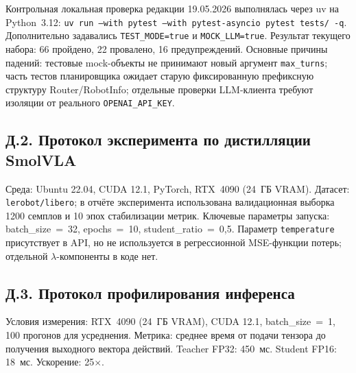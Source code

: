 \documentclass[14pt,a4paper]{extreport}
\begin{document}
Контрольная локальная проверка редакции 19.05.2026 выполнялась через uv на Python~3.12: \texttt{uv run --with pytest --with pytest-asyncio pytest tests/ -q}. Дополнительно задавались \texttt{TEST\_MODE=true} и \texttt{MOCK\_LLM=true}. Результат текущего набора: 66 пройдено, 22 провалено, 16 предупреждений. Основные причины падений: тестовые mock-объекты не принимают новый аргумент \texttt{max\_turns}; часть тестов планировщика ожидает старую фиксированную префиксную структуру Router/RobotInfo; отдельные проверки LLM-клиента требуют изоляции от реального \texttt{OPENAI\_API\_KEY}.

\subsection*{Д.2. Протокол эксперимента по дистилляции SmolVLA}

Среда: Ubuntu 22.04, CUDA 12.1, PyTorch, RTX~4090 (24~ГБ VRAM). Датасет: \texttt{lerobot/libero}; в отчёте эксперимента использована валидационная выборка 1200 семплов и 10 эпох стабилизации метрик. Ключевые параметры запуска: batch\_size~=~32, epochs~=~10, student\_ratio~=~0{,}5. Параметр \texttt{temperature} присутствует в API, но не используется в регрессионной MSE-функции потерь; отдельной $\lambda$-компоненты в коде нет.

\subsection*{Д.3. Протокол профилирования инференса}

Условия измерения: RTX~4090 (24~ГБ VRAM), CUDA 12.1, batch\_size~=~1, 100 прогонов для усреднения. Метрика: среднее время от подачи тензора до получения выходного вектора действий. Teacher FP32: 450~мс. Student FP16: 18~мс. Ускорение: 25$\times$.
\end{document}

